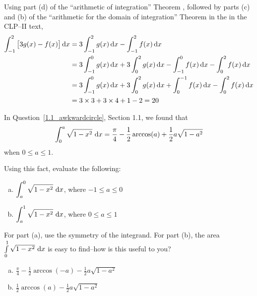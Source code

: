 \begin{solution}
Using part (d) of the ``arithmetic of integration'' Theorem  ,
followed by parts (c) and (b) of the ``arithmetic for the domain of integration'' Theorem
   in the
 in the CLP--II text,
\begin{align*}
\int_{-1}^2 \big[3g(x)-f(x)\big]\,\mathrm{d}x
&=3\int_{-1}^2 g(x)\,\mathrm{d}x-\int_{-1}^2 f(x)\,\mathrm{d}x \\
&=3\int_{-1}^0 g(x)\,\mathrm{d}x+3\int_0^2 g(x)\,\mathrm{d}x
-\int_{-1}^0 f(x)\,\mathrm{d}x-\int_0^2 f(x)\,\mathrm{d}x \\
&=3\int^0_{-1} g(x)\,\mathrm{d}x+3\int_0^2 g(x)\,\mathrm{d}x
+\int_0^{-1} f(x)\,\mathrm{d}x-\int_0^2 f(x)\,\mathrm{d}x \\
&=3\times 3+3\times 4 + 1 - 2 = 20
\end{align*}

\end{solution}
\begin{question} In Question~\ref{1.1_awkwardcircle}, Section 1.1, we found that
\[\int_0^a\sqrt{1-x^2}\ \dee{x}=\frac{\pi}{4} - \frac{1}{2}\arccos(a)+\frac{1}{2}a\sqrt{1-a^2}\]
when $0\le a\le 1$.

Using this fact, evaluate the following:
\begin{enumerate}[(a)]
\item $\displaystyle\int_{a}^0 \sqrt{1-x^2}\ \dee{x}$, where $-1 \leq a \leq 0$
\item $\displaystyle\int_{a}^1 \sqrt{1-x^2}\ \dee{x}$, where $0 \leq a \leq 1$
\end{enumerate}
\end{question}
\begin{hint} For part (a), use the symmetry of the integrand. For part (b), the area $\int	\limits_{0}^1 \sqrt{1-x^2}\ \dee{x}$ is easy to find--how is this useful to you?
\end{hint}
\begin{answer}
\begin{enumerate}[(a)]
\item $\frac{\pi}{4} - \frac{1}{2}\arccos(-a)-\frac{1}{2}a\sqrt{1-a^2}$
\item $\frac{1}{2}\arccos(a)-\frac{1}{2}a\sqrt{1-a^2}$
\end{enumerate}
\end{answer}
